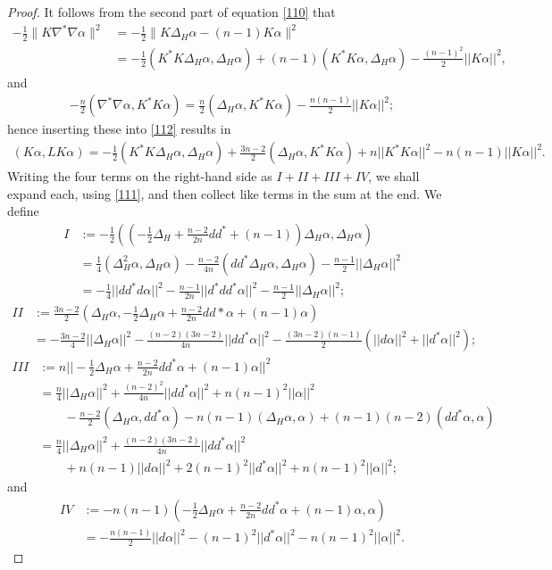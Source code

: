 \documentclass[10pt,reqno]{amsart}
\begin{document}
\begin{proof}
It follows from the second part of equation \eqref{110} that 
\begin{align*}
-\frac12 \| K \nabla^*\nabla \alpha \|^2  & = -\frac12 \| K \Delta_H \alpha - (n-1) K \alpha \|^2 \\ 
&=-\frac12 (K^*K \Delta_H \alpha, \Delta_H \alpha) + (n-1)  (K^* K \alpha, \Delta_H \alpha) -\frac{(n-1)^2}{2} || K \alpha||^2,
\end{align*}
and
\begin{align*}
-\frac{n}{2}( \nabla^*\nabla \alpha, K^* K\alpha) = \frac{n}{2} ( \Delta_H \alpha, K^* K\alpha) - \frac{n(n-1)}{2} ||K\alpha||^2;
\end{align*}
hence inserting these into \eqref{112} results in
\begin{align*}
 (K \alpha, L K\alpha) =-\frac12 ( K^*K \Delta_H \alpha, \Delta_H \alpha) + \frac{3n-2}{2}( \Delta_H \alpha, K^* K\alpha) + n ||K^*K\alpha||^2 - n(n-1) ||K\alpha||^2.
\end{align*}
Writing the four terms on the right-hand side as $I + II + III + IV$, we shall expand each, using \eqref{111}, and then collect like terms in the sum at the end. We define 
\begin{align*}
I & := -\frac12 (  (-\tfrac12\Delta_H + \frac{n-2}{2n} dd^* + (n-1)) \Delta_H \alpha, \Delta_H \alpha) \\
& = \frac14 (\Delta^2_H \alpha, \Delta_H \alpha) - \frac{n-2}{4n}( dd^* \Delta_H \alpha, \Delta_H \alpha) - \frac{n-1}{2} ||\Delta_H \alpha||^2 \\
& = -\frac{1}{4} ||d d^* d \alpha||^2 - \frac{n-1}{2n} ||d^* d d^*\alpha||^2 - \frac{n-1}{2} ||\Delta_H \alpha||^2; 
\end{align*}
\begin{align*}
II & := \frac{3n-2}{2} (\Delta_H \alpha, -\tfrac12 \Delta_H \alpha + \frac{n-2}{2n} dd*\alpha + (n-1)\alpha) \\
& = -\frac{3n-2}{4}||\Delta_H \alpha||^2 - \frac{(n-2)(3n-2)}{4n} ||dd^* \alpha||^2 - \frac{(3n-2)(n-1)}{2}( ||d\alpha||^2 + ||d^* \alpha||^2);
\end{align*}
\begin{align*}
III & := n || -\tfrac12 \Delta_H \alpha + \frac{n-2}{2n}dd^*\alpha + (n-1)\alpha ||^2 \\
& =  \frac{n}{4} ||\Delta_H \alpha||^2 + \frac{(n-2)^2}{4n} ||dd^* \alpha||^2 + n(n-1)^2 ||\alpha||^2 \\
& \qquad - \frac{n-2}{2} (\Delta_H \alpha, dd^* \alpha) - n(n-1) (\Delta_H \alpha, \alpha) + (n-1)(n-2) (dd^* \alpha, \alpha) \\
& = \frac{n}{4} ||\Delta_H \alpha||^2 + \frac{ (n-2)(3n-2)}{4n} ||dd^*\alpha||^2  \\
& \qquad + n(n-1) ||d\alpha||^2 + 2(n-1)^2 ||d^*\alpha||^2 + n(n-1)^2 ||\alpha||^2;
\end{align*}
and
\begin{align*}
IV &:=  -n(n-1)( -\tfrac12 \Delta_H \alpha + \frac{n-2}{2n} dd^*\alpha + (n-1)\alpha, \alpha)  \\
& = -\frac{n(n-1)}{2} ||d\alpha||^2 - (n-1)^2 ||d^* \alpha||^2 - n(n-1)^2 ||\alpha||^2.
\end{align*}


\end{proof}
\end{document}
